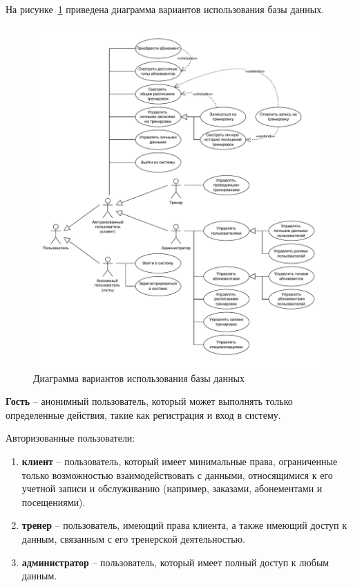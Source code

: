 На рисунке~\ref{fig:use-case} приведена диаграмма вариантов использования базы данных.

\begin{figure}[ht!]
	\begin{center}
		\includegraphics[scale=0.8]{./diag/use-case.pdf}
	\end{center}
	\caption{Диаграмма вариантов использования базы данных}
	\label{fig:use-case}
\end{figure}

\textbf{Гость} -- анонимный пользователь, который может выполнять только определенные действия, такие как регистрация и вход в систему.

Авторизованные пользователи: 
\begin{enumerate}[label=---]
	\item \textbf{клиент} -- пользователь, который имеет минимальные права, ограниченные только возможностью взаимодействовать с данными, относящимися к его учетной записи и обслуживанию (например, заказами, абонементами и посещениями).
	
	\item \textbf{тренер} -- пользователь, имеющий права клиента, а также имеющий доступ к данным, связанным с его тренерской деятельностью.
	
	\item \textbf{администратор} -- пользователь, который имеет полный доступ к любым данным.
\end{enumerate}


